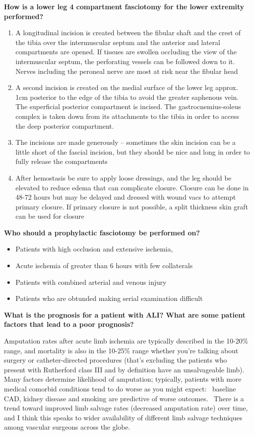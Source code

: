 \documentclass[
]{book}
\begin{document}
\textbf{How is a lower leg 4 compartment fasciotomy for the lower extremity
performed?}

\begin{enumerate}
\def\labelenumi{\arabic{enumi}.}
\item
  A longitudinal incision is created between the fibular shaft and the
  crest of the tibia over the intermuscular septum and the anterior
  and lateral compartments are opened. If tissues are swollen
  occluding the view of the intermuscular septum, the perforating
  vessels can be followed down to it. Nerves including the peroneal
  nerve are most at risk near the fibular head
\item
  A second incision is created on the medial surface of the lower leg
  approx. 1cm posterior to the edge of the tibia to avoid the greater
  saphenous vein. The superficial posterior compartment is incised.
  The gastrocnemius-soleus complex is taken down from its attachments
  to the tibia in order to access the deep posterior compartment.~
\item
  The incisions are made generously -- sometimes the skin incision can
  be a little short of the fascial incision, but they should be nice
  and long in order to fully release the compartments
\item
  After hemostasis be sure to apply loose dressings, and the leg
  should be elevated to reduce edema that can complicate closure.
  Closure can be done in 48-72 hours but may be delayed and dressed
  with wound vacs to attempt primary closure. If primary closure is
  not possible, a split thickness skin graft can be used for closure~
\end{enumerate}

\textbf{Who should a prophylactic fasciotomy be performed on?}

\begin{itemize}
\item
  Patients with high occlusion and extensive ischemia,~
\item
  Acute ischemia of greater than 6 hours with few collaterals
\item
  Patients with combined arterial and venous injury
\item
  Patients who are obtunded making serial examination difficult
\end{itemize}

\textbf{What is the prognosis for a patient with ALI? What are some patient
factors that lead to a poor prognosis?}

Amputation rates after acute limb ischemia are typically described in
the 10-20\% range, and mortality is also in the 10-25\% range whether
you're talking about surgery or catheter-directed procedures (that's
excluding the patients who present with Rutherford class III and by
definition have an unsalvageable limb).~ Many factors determine
likelihood of amputation; typically, patients with more medical comorbid
conditions tend to do worse as you might expect:~ baseline CAD, kidney
disease and smoking are predictive of worse outcomes.~ There is a trend
toward improved limb salvage rates (decreased amputation rate) over
time, and I think this speaks to wider availability of different limb
salvage techniques among vascular surgeons across the globe.
\end{document}
